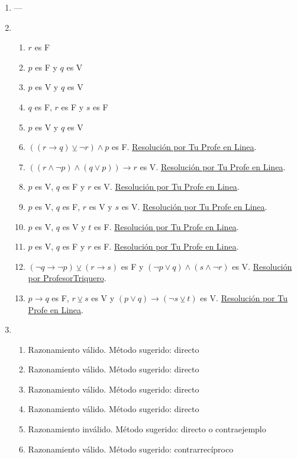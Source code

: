 \documentclass[a4paper]{article}
\newcommand{\exercise}{\item}
\newcommand{\then}{\to}
\newcommand{\xor}{\veebar}
\begin{document}
\begin{enumerate}
\begin{enumerate} [label=(\alph*)]
\end{enumerate}\exercise---\exercise\begin{enumerate} [label=(\alph*)]		\item $r$ es F 
		\item $p$ es F y $q$ es V
		\item $p$ es V y $q$ es V
		\item $q$ es F, $r$ es F y $s$ es F
		\item $p$ es V y $q$ es V
		\item $((r \then q) \xor \neg r) \land p$ es F. \href{https://youtu.be/bitBrw1NvNk?t=663}{Resolución por Tu Profe en Linea}.
		\item $((r \land \neg p) \land (q \lor p)) \then r$ es V. \href{https://youtu.be/bitBrw1NvNk?t=793}{Resolución por Tu Profe en Linea}.
		\item $p$ es V, $q$ es F y $r$ es V. \href{https://youtu.be/bitBrw1NvNk}{Resolución por Tu Profe en Linea}.
		\item $p$ es V, $q$ es F, $r$ es V y $s$ es V. \href{https://youtu.be/bitBrw1NvNk?t=140}{Resolución por Tu Profe en Linea}.
		\item $p$ es V, $q$ es V y $t$ es F. \href{https://youtu.be/bitBrw1NvNk?t=273}{Resolución por Tu Profe en Linea}.
		\item $p$ es V, $q$ es F y $r$ es F. \href{https://youtu.be/bitBrw1NvNk?t=465}{Resolución por Tu Profe en Linea}.
		\item $(\neg q \then \neg p) \xor (r \then s)$ es F y $(\neg p \lor q) \land (s \land \neg r)$ es V. \href{https://youtu.be/p005yi28rgk}{Resolución por ProfesorTriquero}.
		\item $p \then q$ es F, $r \xor s$ es V y $(p \lor q) \then (\neg s \xor t)$ es V. \href{https://youtu.be/-VaC5y-rrMI}{Resolución por Tu Profe en Linea}.
\end{enumerate}\exercise\begin{enumerate} [label=(\alph*)]		\item Razonamiento válido. Método sugerido: directo
		\item Razonamiento válido. Método sugerido: directo
		\item Razonamiento válido. Método sugerido: directo
		\item Razonamiento válido. Método sugerido: directo
		\item Razonamiento inválido. Método sugerido: directo o contraejemplo
		\item Razonamiento válido. Método sugerido: contrarrecíproco

\end{enumerate}
\end{enumerate}
\end{document}
